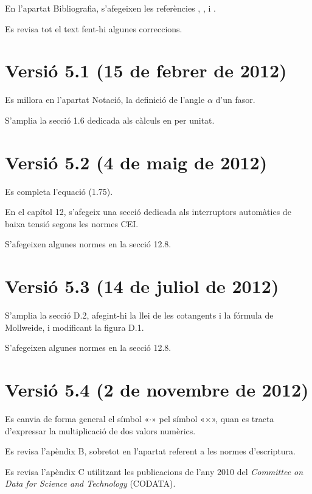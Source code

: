 En l'apartat Bibliografia, s'afegeixen les referències \cite{GRZ}, \cite{DUN}, \cite{REI} i \cite{TLE}.

Es revisa tot el text fent-hi algunes correccions.

\section*{Versió 5.1 (15 de febrer de 2012)}

Es millora en l'apartat Notació, la definició de l'angle $\alpha$ d'un fasor.

S'amplia la secció 1.6 dedicada als càlculs en per unitat.


\section*{Versió 5.2 (4 de maig de 2012)}

Es completa l'equació (1.75).

En el capítol 12, s'afegeix una secció dedicada als interruptors automàtics de baixa tensió segons les normes CEI.

S'afegeixen algunes normes en la secció 12.8.

\section*{Versió 5.3 (14 de juliol de 2012)}

S'amplia la secció D.2, afegint-hi la llei de les cotangents i la fórmula de Mollweide, i modificant  la figura D.1.

S'afegeixen algunes normes en la secció 12.8.

\section*{Versió 5.4 (2 de novembre de 2012)}

Es canvia de forma general el símbol «$\cdot$» pel símbol «$\times$», quan es tracta d'expressar la multiplicació de dos valors numèrics.

Es revisa l'apèndix B, sobretot en l'apartat referent a les normes d'escriptura.

Es revisa l'apèndix C utilitzant les publicacions de l'any 2010 del \textit{Committee on Data for Science and Technology} (CODATA).

